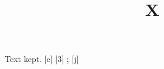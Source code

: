 \documentclass{article}
\title{X \opt[q]}
\begin{document}
Text kept.      [e] [3]  
  ; [j]
\end{document}
